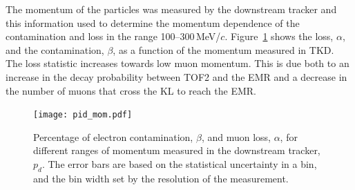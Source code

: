 The momentum of the particles was measured by the downstream tracker 
and this information used to determine the momentum dependence of the 
contamination and loss in the range 100--300\,MeV/$c$.
Figure~\ref{fig:emr_pid_mom} shows the loss, $\alpha$, and the
contamination, $\beta$, as a function of the momentum measured in
TKD.
The loss statistic increases towards low muon momentum.
This is due both to an increase in the decay probability between TOF2
and the EMR and a decrease in the number of muons that cross the KL to
reach the EMR. 
\begin{figure}
  \begin{center}
    \texttt{[image: pid\_mom.pdf]}
  \end{center}
  \caption{
    Percentage of electron contamination, $\beta$, and muon loss,
    $\alpha$, for different ranges of momentum measured in the
    downstream tracker, $p_d$.
    The error bars are based on the statistical uncertainty in a bin,
    and the bin width set by the resolution of the measurement.
  }
  \label{fig:emr_pid_mom}
\end{figure}
